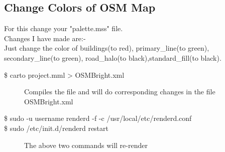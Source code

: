 \subsection{Change Colors of OSM Map}
For this change your "palette.mss" file.\\
Changes I have made are:-\\
Just change the color of buildings(to red), primary\_line(to green), secondary\_line(to green), road\_halo(to black),standard\_fill(to black).\\
\begin{description}
\item [\$ carto project.mml > OSMBright.xml]


Compiles the file and will do corresponding changes in the file OSMBright.xml\\
\item [\$ sudo -u username renderd -f -c /usr/local/etc/renderd.conf]



\item [\$ sudo /etc/init.d/renderd restart]


The above two commands will re-render


\end{description}


